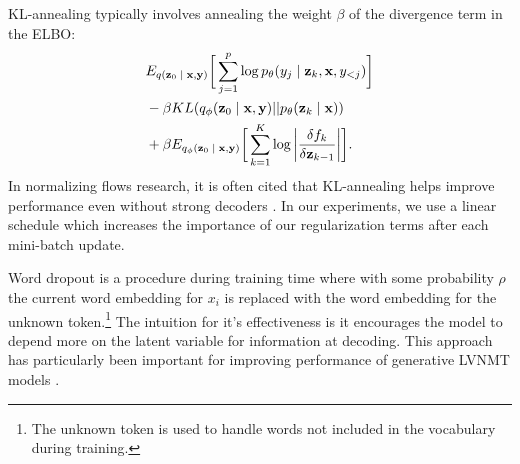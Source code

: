 KL-annealing typically involves annealing the weight $\beta$ of the divergence term in the \ac{ELBO}:
\begin{align}
\begin{split}\label{eq:2}
&
E_{q(\textbf{z}_{0}\; | \;{\textbf{x}, \textbf{y}})} \bigg[ \sum_{j=1}^{p} \log p_{\theta}(y_{j} \; | \;{\textbf{z}_{k}}, \textbf{x}, y_{<j}) \bigg] \\
& - \beta KL(q_{\phi}(\textbf{z}_{0} \; | \;{\textbf{x}, \textbf{y}}) || p_{\theta}(\textbf{z}_{k} \; | \;{\textbf{x}})) \\
&   +  \beta E_{q_{\phi}(\textbf{z}_{0} \; | \;{\textbf{x}, \textbf{y}})} \bigg[\sum_{k=1}^{K} \log \bigg|\frac{\delta f_{k}}{\delta \textbf{z}_{k-1}} \bigg| \bigg].  
\end{split}
\end{align}
In normalizing flows research, it is often cited that KL-annealing helps improve performance even without strong decoders \cite{rezende2015VIwithNF,kingma2016IAF,tomczak2016Householder,Berg2018SylvesterNF,ziegler2019LatentNFforDiscrete}. In our experiments, we use a linear schedule which increases the importance of our regularization terms after each mini-batch update. 


Word dropout is a procedure during training time where with some probability $\rho$ the current word embedding for $x_{i}$ is replaced with the word embedding for the unknown token.\footnote{The unknown token is used to handle words not included in the vocabulary during training.} The intuition for it's effectiveness is it encourages the model to depend more on the latent variable for information at decoding. This approach has particularly been important for improving performance of generative \ac{LVNMT} models \cite{harshil2018GNMT,eikema2018AEVNMT}.

